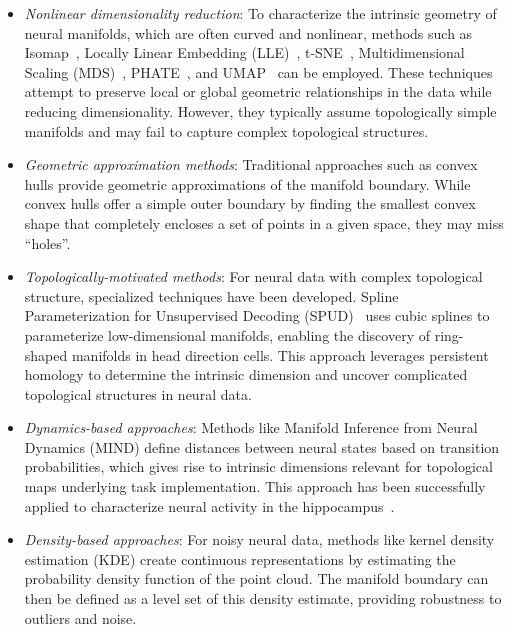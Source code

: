 \documentclass[11pt,a4paper]{article}
\begin{document}
\begin{enumerate}
\begin{itemize}
        \item \textit{Nonlinear dimensionality reduction}: To characterize the intrinsic geometry of neural manifolds, which are often curved and nonlinear, methods such as Isomap~\cite{tenenbaum2000global}, Locally Linear Embedding (LLE)~\cite{roweis2000nonlinear}, t-SNE~\cite{vandermaaten2008visualizing}, Multidimensional Scaling (MDS)~\cite{kruskal1964multidimensional}, PHATE~\cite{moon2019visualizing}, and UMAP~\cite{mcinnes2018umap} can be employed. These techniques attempt to preserve local or global geometric relationships in the data while reducing dimensionality. However, they typically assume topologically simple manifolds and may fail to capture complex topological structures.
        
        \item \textit{Geometric approximation methods}: Traditional approaches such as convex hulls provide geometric approximations of the manifold boundary. While convex hulls offer a simple outer boundary by finding the smallest convex shape that completely encloses a set of points in a given space, they may miss ``holes''.
        
        \item \textit{Topologically-motivated methods}: For neural data with complex topological structure, specialized techniques have been developed. Spline Parameterization for Unsupervised Decoding (SPUD)~\cite{chaudhuri2019intrinsic} uses cubic splines to parameterize low-dimensional manifolds, enabling the discovery of ring-shaped manifolds in head direction cells. This approach leverages persistent homology to determine the intrinsic dimension and uncover complicated topological structures in neural data.
        
        \item \textit{Dynamics-based approaches}: Methods like Manifold Inference from Neural Dynamics (MIND) \cite{low2018probing} define distances between neural states based on transition probabilities, which gives rise to intrinsic dimensions relevant for topological maps underlying task implementation. This approach has been successfully applied to characterize neural activity in the hippocampus~\cite{nieh2021geometry}.
        
        
        \item \textit{Density-based approaches}: For noisy neural data, methods like kernel density estimation (KDE) create continuous representations by estimating the probability density function of the point cloud. The manifold boundary can then be defined as a level set of this density estimate, providing robustness to outliers and noise.
    \end{itemize}
    

\end{enumerate}
\end{document}

